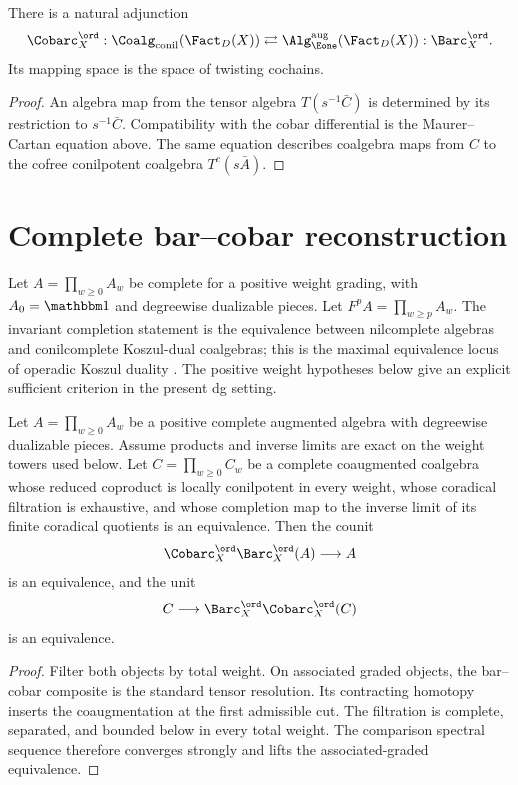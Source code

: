\begin{theorem}
There is a natural adjunction
\[
 \Cobarc_X^{\ord}:\Coalg_{\mathrm{conil}}(\Fact_D(X))
 \rightleftarrows
 \Alg_{\Eone}^{\mathrm{aug}}(\Fact_D(X)):\Barc_X^{\ord}.
\]
Its mapping space is the space of twisting cochains.
\end{theorem}
\begin{proof}
An algebra map from the tensor algebra $T(s^{-1}\bar C)$ is determined by its restriction to $s^{-1}\bar C$. Compatibility with the cobar differential is the Maurer--Cartan equation above. The same equation describes coalgebra maps from $C$ to the cofree conilpotent coalgebra $T^c(s\bar A)$.
\end{proof}

\chapter{Complete bar--cobar reconstruction}
Let $A=\prod_{w\ge0}A_w$ be complete for a positive weight grading, with $A_0=\mathbbm1$ and degreewise dualizable pieces. Let $F^pA=\prod_{w\ge p}A_w$. The invariant completion statement is the equivalence between nilcomplete algebras and conilcomplete Koszul-dual coalgebras; this is the maximal equivalence locus of operadic Koszul duality \cite{Heuts}. The positive weight hypotheses below give an explicit sufficient criterion in the present dg setting.

\begin{theorem}
Let $A=\prod_{w\ge0}A_w$ be a positive complete augmented algebra with degreewise dualizable pieces. Assume products and inverse limits are exact on the weight towers used below. Let $C=\prod_{w\ge0}C_w$ be a complete coaugmented coalgebra whose reduced coproduct is locally conilpotent in every weight, whose coradical filtration is exhaustive, and whose completion map to the inverse limit of its finite coradical quotients is an equivalence. Then the counit
\[
 \Cobarc_X^{\ord}\Barc_X^{\ord}(A)\longrightarrow A
\]
is an equivalence, and the unit
\[
 C\longrightarrow \Barc_X^{\ord}\Cobarc_X^{\ord}(C)
\]
is an equivalence.
\end{theorem}
\begin{proof}
Filter both objects by total weight. On associated graded objects, the bar--cobar composite is the standard tensor resolution. Its contracting homotopy inserts the coaugmentation at the first admissible cut. The filtration is complete, separated, and bounded below in every total weight. The comparison spectral sequence therefore converges strongly and lifts the associated-graded equivalence.
\end{proof}

